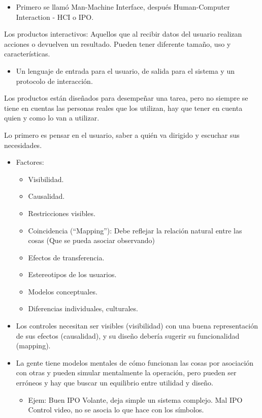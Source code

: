 \documentclass[12pt, twoside, openright]{report} %
\begin{document}
\begin{itemize}
	\item Primero se llamó Man-Machine Interface, después Human-Computer
	      Interaction - HCI o IPO.
\end{itemize}

Los productos interactivos: Aquellos que al recibir datos del
usuario realizan acciones o devuelven un resultado. Pueden tener
diferente tamaño, uso y características.

\begin{itemize}
	\item Un lenguaje de entrada para el usuario, de salida para el sistema
	      y un protocolo de interacción.
\end{itemize}

Los productos están diseñados para desempeñar una tarea, pero no
siempre se tiene en cuentas las personas reales que los utilizan,
hay que tener en cuenta quien y como lo van a utilizar.

Lo primero es pensar en el usuario, saber a quién va dirigido y
escuchar sus necesidades.

\begin{itemize}
	\item Factores:
	      \begin{itemize}
		      \item Visibilidad.

		      \item Causalidad.

		      \item Restricciones visibles.

		      \item Coincidencia (\enquote{Mapping}): Debe reflejar la relación natural
		            entre las cosas (Que se pueda asociar observando)

		      \item Efectos de transferencia.

		      \item Estereotipos de los usuarios.

		      \item Modelos conceptuales.

		      \item Diferencias individuales, culturales.
	      \end{itemize}
	\item Los controles necesitan ser visibles (visibilidad) con una buena
	      representación de sus efectos (causalidad), y su diseño debería
	      sugerir su funcionalidad (mapping).
	\item La gente tiene modelos mentales de cómo funcionan las cosas por
	      asociación con otras y pueden simular mentalmente la operación,
	      pero pueden ser erróneos y hay que buscar un equilibrio entre
	      utilidad y diseño.

	      \begin{itemize}
		      \item Ejem: Buen IPO Volante, deja simple un sistema complejo. Mal IPO
		            Control video, no se asocia lo que hace con los símbolos.
	      \end{itemize}
\end{itemize}
\end{document}
